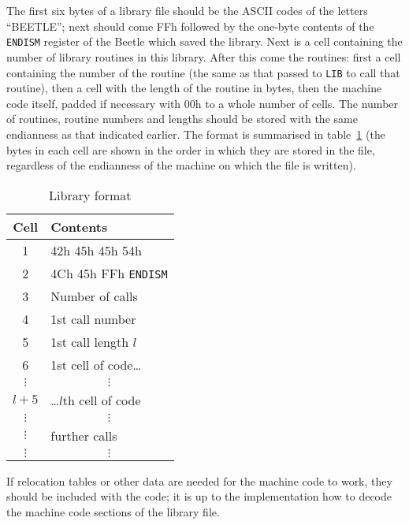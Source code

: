 \documentclass{article}
\begin{document}
The first six bytes of a library file should be the ASCII codes of the letters
``BEETLE''; next should come FFh followed by the one-byte contents of the {\tt
ENDISM} register of the Beetle which saved the library. Next is a cell
containing the number of library routines in this library. After this come the
routines: first a cell containing the number of the routine (the same as that
passed to {\tt LIB} to call that routine), then a cell with the length of the
routine in bytes, then the machine code itself, padded if necessary with 00h to
a whole number of cells. The number of routines, routine numbers and lengths
should be stored with the same endianness as that indicated earlier. The format
is summarised in table~\ref{libtable} (the bytes in each cell are shown in the
order in which they are stored in the file, regardless of the endianness of the
machine on which the file is written).

\begin{table}[htbp]
\begin{center}
\begin{tabular}{|c|l|} \hline
\rule[-2mm]{0mm}{6mm}\bf Cell & \bf Contents \\ \hline
1 & 42h 45h 45h 54h \\ \hline
2 & 4Ch 45h FFh {\tt ENDISM} \\ \hline
3 & Number of calls \\ \hline
4 & 1st call number \\ \hline
5 & 1st call length $l$\/ \\ \hline
6 & 1st cell of code\dots \\ \hline
$\vdots$ & \multicolumn{1}{c|}{$\vdots$} \\ \hline
$l+5$\/ & \dots$l$\/th cell of code \\ \hline
$\vdots$ & \multicolumn{1}{c|}{$\vdots$} \\ \hline
$\vdots$ & further calls \\ \hline
$\vdots$ & \multicolumn{1}{c|}{$\vdots$} \\ \hline
\end{tabular}
\end{center}
\vspace{-2mm}
\caption{\label{libtable}Library format}
\end{table}

If relocation tables or other data are needed for the machine code to work, they
should be included with the code; it is up to the implementation how to decode
the machine code sections of the library file.
\end{document}
